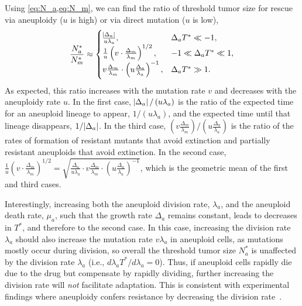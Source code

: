 \documentclass[12pt]{extarticle}
\begin{document}
Using \cref{eq:N_a,eq:N_m}, we can find the ratio of threshold tumor size for rescue via aneuploidy ($u$ is high) or via direct mutation ($u$ is low),
\begin{equation} \label{eq:N_ratio}
\frac{N^*_a}{N^*_m} \approx \begin{cases}
    \frac{\abs{\Delta_a}}{u\lambda_a} ,&
  \Delta_a T^* \ll -1 ,\\ 
  \frac{1}{u}\left(v \cdot \frac{\Delta_m}{\lambda_m}\right)^{1/2} ,&
  -1 \ll \Delta_a T^* \ll 1  ,\\ 
  v \frac{\Delta_m}{\lambda_m} \cdot \left(u\frac{\Delta_a}{\lambda_a}\right)^{-1}  ,&
   \Delta_a T^* \gg 1 .
  \end{cases}
\end{equation}
As expected, this ratio increases with the mutation rate $v$ and decreases with the aneuploidy rate $u$.
In the first case, $\abs{\Delta_a}/\left(u\lambda_a\right)$ is  the ratio of the expected time for an aneuploid lineage to appear, $1/\left(u\lambda_a\right)$, and the expected time until that lineage disappears, $1/\abs{\Delta_a}$.
In the third case, $\left(v \frac{\Delta_m}{\lambda_m}\right) / \left(u \frac{\Delta_a}{\lambda_a}\right)$ is the ratio of the rates of formation of resistant mutants that avoid extinction and partially resistant aneuploids that avoid extinction.
In the second case, $\frac{1}{u}\left(v \cdot \frac{\Delta_m}{\lambda_m}\right)^{1/2}=\sqrt{\frac{\Delta_a}{u\lambda_a} \cdot v \frac{\Delta_m}{\lambda_m} \cdot \left(u\frac{\Delta_a}{\lambda_a}\right)^{-1}}$, which is the geometric mean of the first and third cases.

Interestingly, increasing both the aneuploid division rate, $\lambda_a$, and the aneuploid death rate, $\mu_a$, such that the growth rate $\Delta_a$ remains constant, leads to decreases in $T^*$, and therefore to the second case. In this case, increasing the division rate $\lambda_a$ should also increase the mutation rate $v\lambda_a$ in aneuploid cells, as mutations mostly occur during division, so overall the threshold tumor size $N_a^*$ is unaffected by the division rate $\lambda_a$ (i.e., $d \lambda_a T^*/d\lambda_a = 0$). Thus, if aneuploid cells rapidly die due to the drug but compensate by rapidly dividing, further increasing  the division rate will \emph{not} facilitate adaptation. %
This is consistent with experimental findings where aneuploidy confers resistance by decreasing the division rate~\citep{replogle2020aneuploidy}.
\end{document}
